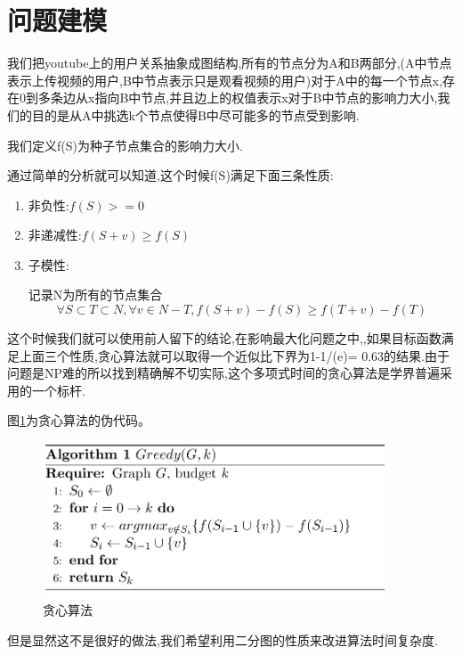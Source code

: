 \documentclass[11pt, a4paper]{article}
\begin{document}
  \section{问题建模}

  我们把youtube上的用户关系抽象成图结构,所有的节点分为A和B两部分,(A中节点表示上传视频的用户,B中节点表示只是观看视频的用户)对于A中的每一个节点x,存在0到多条边从x指向B中节点,并且边上的权值表示x对于B中节点的影响力大小,我们的目的是从A中挑选k个节点使得B中尽可能多的节点受到影响.

  我们定义f(S)为种子节点集合的影响力大小.

  通过简单的分析就可以知道,这个时候f(S)满足下面三条性质:

  \begin{enumerate}
  \item 非负性:$f(S)>=0$
  \item 非递减性:$f(S+v)\ge f(S)$
  \item 子模性:

  记录N为所有的节点集合
  \begin{equation}
    \forall S \subset T \subset N, \forall v \in N - T,f(S+v)-f(S) \ge f(T+v) - f(T)
  \end{equation}

  \end{enumerate}

  这个时候我们就可以使用前人留下的结论,在影响最大化问题之中,,如果目标函数满足上面三个性质,贪心算法就可以取得一个近似比下界为1-1/(e)= 0.63的结果.由于问题是NP难的所以找到精确解不切实际,这个多项式时间的贪心算法是学界普遍采用的一个标杆.

  图\ref{fig:greedy}为贪心算法的伪代码。

  \begin{figure}[H]
    \centering\includegraphics[width=4in]{images/greedy.png}
    \caption{贪心算法}\label{fig:greedy}
  \end{figure}

  但是显然这不是很好的做法,我们希望利用二分图的性质来改进算法时间复杂度.
\end{document}
